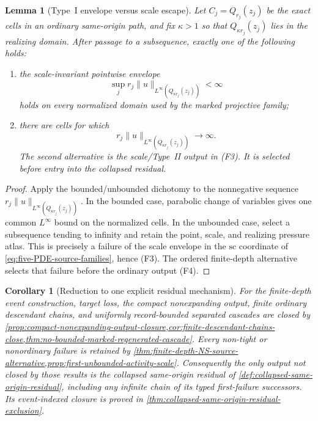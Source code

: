 \documentclass[11pt]{amsart}
\numberwithin{equation}{section}
\theoremstyle{plain}
\newtheorem{lemma}[lemma]{Lemma}
\newtheorem{corollary}[corollary]{Corollary}
\theoremstyle{definition}
\theoremstyle{remark}
\begin{document}
\begin{lemma}[Type~I envelope versus scale escape]
\label{lem:typeI-envelope-scale-escape}
Let \(C_j=Q_{r_j}(z_j)\) be the exact cells in an ordinary same-origin path,
and fix \(\kappa>1\) so that \(Q_{\kappa r_j}(z_j)\) lies in the realizing
domain.  After passage to a subsequence, exactly one of the following holds:
\begin{enumerate}[label=\textup{(I\arabic*)},leftmargin=2.8em]
\item the scale-invariant pointwise envelope
\begin{equation}\label{eq:local-typeI-envelope}
 \sup_j r_j\|u\|_{L^\infty(Q_{\kappa r_j}(z_j))}<\infty
\end{equation}
holds on every normalized domain used by the marked projective family;
\item there are cells for which
\begin{equation}\label{eq:local-typeII-scale-escape}
 r_j\|u\|_{L^\infty(Q_{\kappa r_j}(z_j))}\longrightarrow\infty.
\end{equation}
The second alternative is the scale/Type~II output in \textup{(F3)}.  It is
selected before entry into the collapsed residual.
\end{enumerate}
\end{lemma}

\begin{proof}
Apply the bounded/unbounded dichotomy to the nonnegative sequence
\(r_j\|u\|_{L^\infty(Q_{\kappa r_j}(z_j))}\).  In the bounded case, parabolic
change of variables gives one common \(L^\infty\) bound on the normalized
cells.  In the unbounded case, select a subsequence tending to infinity and
retain the point, scale, and realizing pressure atlas.  This is precisely a
failure of the scale envelope in the \(\mathrm{sc}\) coordinate of
\eqref{eq:five-PDE-source-families}, hence \textup{(F3)}.  The ordered
finite-depth alternative selects that failure before the ordinary output
\textup{(F4)}.
\end{proof}

\begin{corollary}[Reduction to one explicit residual mechanism]
\label{cor:reduction-to-collapsed-residual}
For the finite-depth event construction, target loss, the compact
nonexpanding output, finite ordinary descendant chains, and uniformly record-bounded
separated cascades are closed by
\cref{prop:compact-nonexpanding-output-closure,cor:finite-descendant-chains-close,thm:no-bounded-marked-regenerated-cascade}.
Every non-tight or nonordinary failure is retained by
\cref{thm:finite-depth-NS-source-alternative,prop:first-unbounded-activity-scale}.
Consequently the only output not closed by those results is the collapsed
same-origin residual of
\cref{def:collapsed-same-origin-residual}, including any infinite chain of its
typed first-failure successors.  Its event-indexed closure is proved in
\cref{thm:collapsed-same-origin-residual-exclusion}.
\end{corollary}
\end{document}
